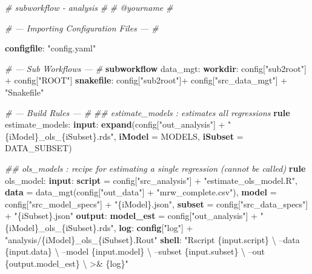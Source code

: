 \documentclass[]{book}
\newenvironment{Shaded}{\begin{snugshade}}{\end{snugshade}}
\newcommand{\KeywordTok}[1]{\textcolor[rgb]{0.13,0.29,0.53}{\textbf{{#1}}}}
\newcommand{\StringTok}[1]{\textcolor[rgb]{0.31,0.60,0.02}{{#1}}}
\newcommand{\CommentTok}[1]{\textcolor[rgb]{0.56,0.35,0.01}{\textit{{#1}}}}
\newcommand{\NormalTok}[1]{{#1}}
\theoremstyle{definition}
\theoremstyle{definition}
\theoremstyle{definition}
\theoremstyle{remark}
\begin{document}
\begin{Shaded}
\begin{Highlighting}[]
\CommentTok{# subworkflow - analysis}
\CommentTok{#}
\CommentTok{# @yourname}
\CommentTok{#}

\CommentTok{# --- Importing Configuration Files --- #}

\KeywordTok{configfile}\NormalTok{: }\StringTok{"config.yaml"}

\CommentTok{# --- Sub Workflows --- #}
\KeywordTok{subworkflow} \NormalTok{data_mgt:}
   \KeywordTok{workdir}\NormalTok{: config[}\StringTok{"sub2root"}\NormalTok{] + config[}\StringTok{"ROOT"}\NormalTok{]}
   \KeywordTok{snakefile}\NormalTok{:  config[}\StringTok{"sub2root"}\NormalTok{]+ config[}\StringTok{"src_data_mgt"}\NormalTok{] + }\StringTok{"Snakefile"}

\CommentTok{# --- Build Rules --- #}
\CommentTok{## estimate_models    : estimates all regressions}
\KeywordTok{rule} \NormalTok{estimate_models:}
    \KeywordTok{input}\NormalTok{:}
        \KeywordTok{expand}\NormalTok{(config[}\StringTok{"out_analysis"}\NormalTok{] + }\StringTok{"\{iModel\}_ols_\{iSubset\}.rds"}\NormalTok{,}
                    \KeywordTok{iModel} \NormalTok{= MODELS,}
                    \KeywordTok{iSubset} \NormalTok{= DATA_SUBSET)}

\CommentTok{## ols_models         : recipe for estimating a single regression (cannot be called)}
\KeywordTok{rule} \NormalTok{ols_model:}
    \KeywordTok{input}\NormalTok{:}
        \KeywordTok{script} \NormalTok{= config[}\StringTok{"src_analysis"}\NormalTok{] + }\StringTok{"estimate_ols_model.R"}\NormalTok{,}
        \KeywordTok{data}   \NormalTok{= data_mgt(config[}\StringTok{"out_data"}\NormalTok{] + }\StringTok{"mrw_complete.csv"}\NormalTok{),}
        \KeywordTok{model}  \NormalTok{= config[}\StringTok{"src_model_specs"}\NormalTok{] + }\StringTok{"\{iModel\}.json"}\NormalTok{,}
        \KeywordTok{subset} \NormalTok{= config[}\StringTok{"src_data_specs"}\NormalTok{]  + }\StringTok{"\{iSubset\}.json"}
    \KeywordTok{output}\NormalTok{:}
        \KeywordTok{model_est} \NormalTok{= config[}\StringTok{"out_analysis"}\NormalTok{] + }\StringTok{"\{iModel\}_ols_\{iSubset\}.rds"}\NormalTok{,}
    \KeywordTok{log}\NormalTok{:}
        \KeywordTok{config}\NormalTok{[}\StringTok{"log"}\NormalTok{] + }\StringTok{"analysis/\{iModel\}_ols_\{iSubset\}.Rout"}
    \KeywordTok{shell}\NormalTok{:}
        \StringTok{"Rscript \{input.script\} \textbackslash{}}
\StringTok{            --data \{input.data\} \textbackslash{}}
\StringTok{            --model \{input.model\} \textbackslash{}}
\StringTok{            --subset \{input.subset\} \textbackslash{}}
\StringTok{            --out \{output.model_est\} \textbackslash{}}
\StringTok{            >& \{log\}"}
\end{Highlighting}
\end{Shaded}
\end{document}
